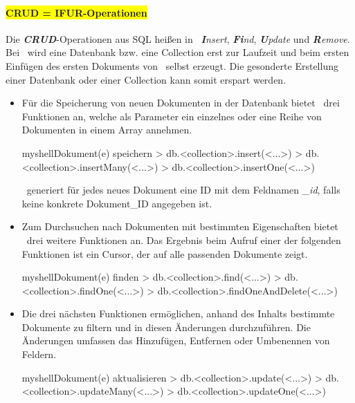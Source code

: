 \paragraph{\colorbox{yellow}{CRUD = IFUR-Operationen}\label{ifur}}
Die \textit{\textbf{CRUD}}-Operationen aus SQL heißen in \mongo\ \textit{\textbf{I}nsert}, \textit{\textbf{Fi}nd}, \textit{\textbf{U}pdate} und \textit{\textbf{R}emove}. Bei \mongo\ wird eine Datenbank bzw. eine Collection erst zur Laufzeit und beim ersten Einfügen des ersten Dokuments von \mongo\ selbst erzeugt. Die gesonderte Erstellung einer Datenbank oder einer Collection kann somit erspart werden.
\begin{itemize}
\item Für die Speicherung von neuen Dokumenten in der Datenbank bietet \mongo\ drei Funktionen an, welche als Parameter ein einzelnes oder eine Reihe von Dokumenten in einem Array annehmen. %
\begin{listingsboxShell}[label={lst:insert}]{myshell}{Dokument(e) speichern}
> db.<collection>.insert(<...>)
> db.<collection>.insertMany(<...>)
> db.<collection>.insertOne(<...>)
\end{listingsboxShell}
\mongo\ generiert für jedes neues Dokument eine ID mit dem Feldnamen \textit{\_id}, falls keine konkrete Dokument\_ID angegeben ist.

\item Zum Durchsuchen nach Dokumenten mit bestimmten Eigenschaften bietet \mongo\ drei weitere Funktionen an. Das Ergebnis beim Aufruf einer der folgenden Funktionen ist ein Cursor, der auf alle passenden Dokumente zeigt.
\begin{listingsboxShell}[label={lst:find}]{myshell}{Dokument(e) finden}
> db.<collection>.find(<...>)
> db.<collection>.findOne(<...>)
> db.<collection>.findOneAndDelete(<...>)
\end{listingsboxShell}

\item Die drei nächsten Funktionen ermöglichen, anhand des Inhalts bestimmte Dokumente zu filtern und in diesen Änderungen durchzuführen. Die Änderungen umfassen das Hinzufügen, Entfernen oder Umbenennen von Feldern.
\begin{listingsboxShell}[label={lst:update}]{myshell}{Dokument(e) aktualisieren}
> db.<collection>.update(<...>)
> db.<collection>.updateMany(<...>)
> db.<collection>.updateOne(<...>)
\end{listingsboxShell}


\end{itemize}
